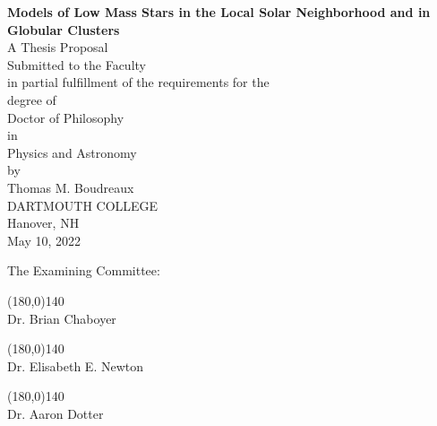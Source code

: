 \documentclass[11pt, manuscript]{aastex62}
\begin{document}
\begin{titlepage}
    \begin{center}
        \Large
        \vspace*{1cm}
		\textbf{Models of Low Mass Stars in the Local Solar Neighborhood and in Globular Clusters} \\
        \vspace{0.75cm}
        \large
        A Thesis Proposal \\
        \vspace{0.25cm}
        Submitted to the Faculty \\
        in partial fulfillment of the requirements for the \\
        degree of \\
        \vspace{0.25cm}
        Doctor of Philosophy \\
        \vspace{0.25cm}
        in \\
        \vspace{0.25cm}
        Physics and Astronomy \\
        \vspace{0.5cm}
        by \\
        \vspace{0.25cm}
        Thomas M. Boudreaux \\
        \vspace{0.3cm}
        DARTMOUTH COLLEGE \\
        Hanover, NH \\
        May 10, 2022
     \end{center}
\vspace{1cm}
\begin{flushright}
The Examining Committee: \hspace{\parindent}
\vspace{0.4cm}
\end{flushright}
\begin{flushright}
\line(180,0){140}\\
        Dr. Brian Chaboyer
        \end{flushright}
        
        \begin{flushright}
        \line(180,0){140}\\
        Dr. Elisabeth E. Newton
        \end{flushright}
        
        \begin{flushright}
        \line(180,0){140}\\
        Dr. Aaron Dotter
        \end{flushright}

\end{titlepage}
\end{document}
